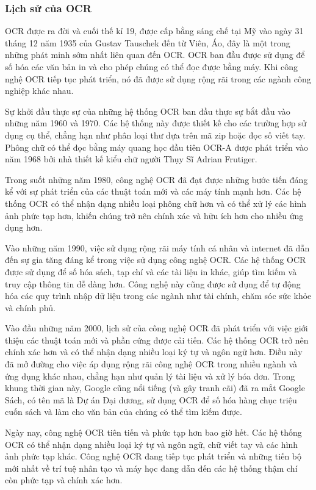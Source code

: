 \subsubsection{Lịch sử của OCR}

OCR được ra đời và cuối thế kỉ 19, được cấp bằng sáng chế tại Mỹ vào ngày 31 tháng 12 năm 1935 của Gustav Tauschek đến từ Viên, Áo, đây là một trong những phát minh sớm nhất liên quan đến OCR. OCR ban đầu được sử dụng để số hóa các văn bản in và cho phép chúng có thể đọc được bằng máy. Khi công nghệ OCR tiếp tục phát triển, nó đã được sử dụng rộng rãi trong các ngành công nghiệp khác nhau.

Sự khởi đầu thực sự của những hệ thống OCR ban đầu thực sự bắt đầu vào những năm 1960 và 1970. Các hệ thống này được thiết kế cho các trường hợp sử dụng cụ thể, chẳng hạn như phân loại thư dựa trên mã zip hoặc đọc số viết tay. Phông chữ có thể đọc bằng máy quang học đầu tiên OCR-A được phát triển vào năm 1968 bởi nhà thiết kế kiểu chữ người Thụy Sĩ Adrian Frutiger.

Trong suốt những năm 1980, công nghệ OCR đã đạt được những bước tiến đáng kể với sự phát triển của các thuật toán mới và các máy tính mạnh hơn. Các hệ thống OCR có thể nhận dạng nhiều loại phông chữ hơn và có thể xử lý các hình ảnh phức tạp hơn, khiến chúng trở nên chính xác và hữu ích hơn cho nhiều ứng dụng hơn.

Vào những năm 1990, việc sử dụng rộng rãi máy tính cá nhân và internet đã dẫn đến sự gia tăng đáng kể trong việc sử dụng công nghệ OCR. Các hệ thống OCR được sử dụng để số hóa sách, tạp chí và các tài liệu in khác, giúp tìm kiếm và truy cập thông tin dễ dàng hơn. Công nghệ này cũng được sử dụng để tự động hóa các quy trình nhập dữ liệu trong các ngành như tài chính, chăm sóc sức khỏe và chính phủ.

Vào đầu những năm 2000, lịch sử của công nghệ OCR đã phát triển với việc giới thiệu các thuật toán mới và phần cứng được cải tiến. Các hệ thống OCR trở nên chính xác hơn và có thể nhận dạng nhiều loại ký tự và ngôn ngữ hơn. Điều này đã mở đường cho việc áp dụng rộng rãi công nghệ OCR trong nhiều ngành và ứng dụng khác nhau, chẳng hạn như quản lý tài liệu và xử lý hóa đơn. Trong khung thời gian này, Google cũng nổi tiếng (và gây tranh cãi) đã ra mắt Google Sách, có tên mã là Dự án Đại dương, sử dụng OCR để số hóa hàng chục triệu cuốn sách và làm cho văn bản của chúng có thể tìm kiếm được.

Ngày nay, công nghệ OCR tiên tiến và phức tạp hơn bao giờ hết. Các hệ thống OCR có thể nhận dạng nhiều loại ký tự và ngôn ngữ, chữ viết tay và các hình ảnh phức tạp khác. Công nghệ OCR đang tiếp tục phát triển và những tiến bộ mới nhất về trí tuệ nhân tạo và máy học đang dẫn đến các hệ thống thậm chí còn phức tạp và chính xác hơn.

